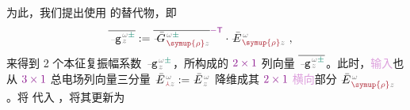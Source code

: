 为此，我们\cite{xieAnalytic3DVector}提出使用  的替代物，即
\begin{align} \label{eq:amp_vec-transverse_input}
	\overline{\Xint{\begin{smallmatrix} ~ \\ {}^{}_{\mathcolor{gray}{-}} \\ ~ \end{smallmatrix}}{09}{\mathtt{g}}^{\;\!\mathcolor{gray}{\omega} \textcolor{PineGreen}{\pm}}_{\;\! \mathcolor{gray}{z}}} &:= \overline{\Xint{\mathcolor{gray}{-}}{20}{\bar{G}}^{\;\!\mathcolor{gray}{\omega} \textcolor{PineGreen}{\pm}}_{\;\! \textcolor{Maroon}{\symup{\rho}} \mathcolor{gray}{z}}}^{\textcolor{Plum}{-\mathsf{T}}} \cdot \Xint{\mathcolor{gray}{-}}{30}{\bar{E}}^{\;\!\mathcolor{gray}{\omega}}_{\;\! \textcolor{Maroon}{\symup{\rho}} \mathcolor{gray}{z}} ~,
\end{align}
来得到 2 个\textcolor{PineGreen}{本征复振幅}系数 $\Xint{\begin{smallmatrix} ~ \\ {}^{}_{\mathcolor{gray}{-}} \\ ~ \end{smallmatrix}}{09}{\mathtt{g}}^{\;\!\mathcolor{gray}{\omega} \textcolor{PineGreen}{\pm}}_{\;\! \mathcolor{gray}{z}}$，所构成的 $\textcolor{Plum}{2 \times 1}$ 列向量 $\overline{\Xint{\begin{smallmatrix} ~ \\ {}^{}_{\mathcolor{gray}{-}} \\ ~ \end{smallmatrix}}{09}{\mathtt{g}}^{\;\!\mathcolor{gray}{\omega} \textcolor{PineGreen}{\pm}}_{\;\! \mathcolor{gray}{z}}}$。此时，\textcolor{Plum}{输入}也从 $\textcolor{Plum}{3 \times 1}$ \textcolor{PineGreen}{总电场列向量}三分量 $\Xint{\mathcolor{gray}{-}}{25}{\bar{E}}^{\;\!\mathcolor{gray}{\omega}}_{\;\! \textcolor{Maroon}{\Yup} \mathcolor{gray}{z}} := \Xint{\mathcolor{gray}{-}}{25}{\bar{E}}^{\;\!\mathcolor{gray}{\omega}}_{\;\! \mathcolor{gray}{z}}$ 降维成其 $\textcolor{Plum}{2 \times 1}$ \textcolor{Plum}{横向}部分 $\Xint{\mathcolor{gray}{-}}{25}{\bar{E}}^{\;\!\mathcolor{gray}{\omega}}_{\;\! \textcolor{Maroon}{\symup{\rho}} \mathcolor{gray}{z}}$。将  代入 ，将其更新为
